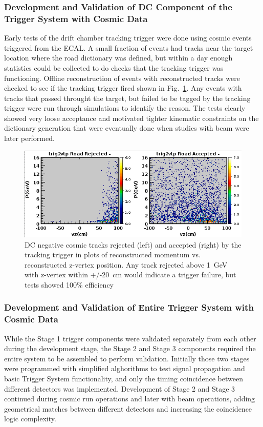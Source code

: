 \subsubsection{Development and Validation of DC Component of the Trigger System with Cosmic Data}

Early tests of the drift chamber tracking trigger were done using cosmic events triggered from the ECAL. A small fraction of events had tracks near the target location where the road dictionary was defined, but within a day enough statistics could be collected to do checks that the tracking trigger was functioning. Offline reconstruction of events with reconstructed tracks were checked to see if the tracking trigger fired shown in Fig.~\ref{fig:dc_cosmic_efficiency}. Any events with tracks that passed throught the target, but failed to be tagged by the tracking trigger were run through simulations to identify the reason. The tests clearly showed very loose acceptance and motivated tighter kinematic constraints on the dictionary generation that were eventually done when studies with beam were later performed.

\begin{figure}[!htb]
 	\centering
  	\includegraphics[width=1.0\columnwidth,keepaspectratio]{img/dc_cosmic_efficiency.png}
 	\caption{DC negative cosmic tracks rejected (left) and accepted (right) by the tracking trigger in plots of reconstructed momentum vs. reconstructed z-vertex position. Any track rejected above 1~GeV with z-vertex within +/-20~cm would indicate a trigger failure, but tests showed 100\% efficiency}
	\label{fig:dc_cosmic_efficiency}
\end{figure}


\subsubsection{Development and Validation of Entire Trigger System with Cosmic Data} 

While the Stage 1 trigger components were validated separately from each other during the development stage, the Stage 2 and Stage 3 components required the entire system to be assembled to perform validation. Initially those two stages were programmed with simplified alghorithms to test signal propagation and basic Trigger System functionality, and only the timing coincidence between different detectors was implemented. Development of Stage 2 and Stage 3 continued during cosmic run operations and later with beam operations, adding geometrical matches between different detectors and increasing the coincidence logic complexity.



